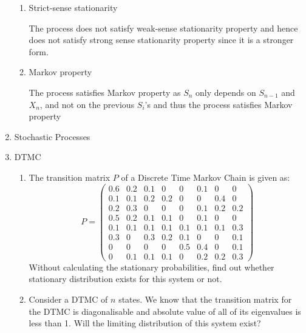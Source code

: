\documentclass[12pt, oneside]{article}
\begin{document}
\begin{enumerate}
{\begin{enumerate}
{            We have shown that \(E(S_n) = \left(\frac{2}{3}\right)^{n-1} 50\), which is a function
            of \(n\), thus this stochastic process is not wide-sense stationary.
        }
        \item {
            Strict-sense stationarity 

            The process does not satisfy weak-sense stationarity property and hence does not
            satisfy strong sense stationarity property since it is a stronger form.
        }
        \item {
            Markov property

            The process satisfies Markov property as \(S_n\) only depends on \(S_{n-1}\)
            and \(X_{n}\), and not on the previous \(S_i\)'s and thus the process
            satisfies Markov property
        }
    \end{enumerate}
}

\item Stochastic Processes

\item {
    DTMC

    \begin{enumerate}
        \item {
            The transition matrix \(P\) of a Discrete Time Markov Chain is given as:
            \[P = \begin{pmatrix}
                0.6 & 0.2 & 0.1 & 0 & 0 & 0.1 & 0 & 0 \\
                0.1	& 0.1 & 0.2 & 0.2 & 0 & 0 & 0.4 & 0 \\
                0.2 & 0.3 & 0 & 0 & 0 & 0.1 & 0.2 & 0.2 \\
                0.5 & 0.2 & 0.1 & 0.1 & 0 & 0.1 & 0 & 0 \\
                0.1 & 0.1 & 0.1 & 0.1 & 0.1 & 0.1 & 0.1 & 0.3 \\
                0.3 & 0 & 0.3 & 0.2 & 0.1 & 0 & 0 & 0.1 \\
                0 & 0 & 0 & 0 & 0.5 & 0.4 & 0 & 0.1 \\
                0 & 0.1 & 0.1 & 0.1 & 0 & 0.2 & 0.2 & 0.3
            \end{pmatrix}\]
            Without calculating the stationary probabilities, find out whether stationary
            distribution exists for this system or not.
        }
        \item {
            Consider a DTMC of \(n\) states. We know that the transition matrix for the
            DTMC is diagonalisable and absolute value of all of its eigenvalues is less than 1.
            Will the limiting distribution of this system exist?

}
\end{enumerate}}
\end{enumerate}
\end{document}
